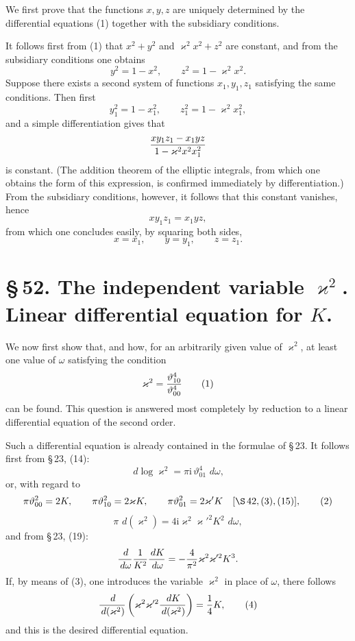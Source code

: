 \documentclass[11pt]{article}
\providecommand{\dd}{\,d}
\providecommand{\tht}{\vartheta}
\providecommand{\ii}{\mathrm{i}}
\begin{document}
We first prove that the functions $x,y,z$ are uniquely determined by the differential equations (1) together with the subsidiary conditions.

It follows first from (1) that $x^2+y^2$ and $\varkappa^2x^2+z^2$ are constant, and from the subsidiary conditions one obtains
\begin{equation}
y^2=1-x^2,
\qquad
z^2=1-\varkappa^2x^2.
\tag{4}
\end{equation}
Suppose there exists a second system of functions $x_1,y_1,z_1$ satisfying the same conditions. Then first
\[
y_1^2=1-x_1^2,
\qquad
z_1^2=1-\varkappa^2x_1^2,
\]
and a simple differentiation gives that
\[
{xy_1z_1-x_1yz\over 1-\varkappa^2x^2x_1^2}
\]
is constant. (The addition theorem of the elliptic integrals, from which one obtains the form of this expression, is confirmed immediately by differentiation.) From the subsidiary conditions, however, it follows that this constant vanishes, hence
\[
xy_1z_1=x_1yz,
\]
from which one concludes easily, by squaring both sides,
\[
x=x_1,
\qquad y=y_1,
\qquad z=z_1.
\]

\section*{\S\,52. The independent variable $\varkappa^2$. Linear differential equation for $K$.}

We now first show that, and how, for an arbitrarily given value of $\varkappa^2$, at least one value of $\omega$ satisfying the condition
\begin{equation}
\varkappa^2={\tht_{10}^4\over\tht_{00}^4}
\tag{1}
\end{equation}
can be found. This question is answered most completely by reduction to a linear differential equation of the second order.

Such a differential equation is already contained in the formulae of \S\,23. It follows first from \S\,23, (14):
\[
\dd\log\varkappa^2=\pi\ii\,\tht_{01}^4\,\dd\omega,
\]
or, with regard to
\begin{equation}
\pi\tht_{00}^2=2K,
\qquad
\pi\tht_{10}^2=2\varkappa K,
\qquad
\pi\tht_{01}^2=2\varkappa'K
\quad[\S\,42,(3),(15)],
\tag{2}
\end{equation}
\begin{equation}
\pi\,\dd(\varkappa^2)=4\ii\varkappa^2\varkappa'^2K^2\,\dd\omega,
\tag{3}
\end{equation}
and from \S\,23, (19):
\[
{\dd\over\dd\omega}{1\over K^2}{\dd K\over\dd\omega}
=-{4\over\pi^2}\varkappa^2\varkappa'^2K^3.
\]
If, by means of (3), one introduces the variable $\varkappa^2$ in place of $\omega$, there follows
\begin{equation}
{\dd\over\dd(\varkappa^2)}
\left(\varkappa^2\varkappa'^2{\dd K\over\dd(\varkappa^2)}\right)
={1\over4}K,
\tag{4}
\end{equation}
and this is the desired differential equation.
\end{document}
